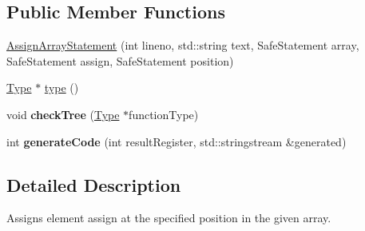 \subsection*{Public Member Functions}
\begin{DoxyCompactItemize}
\item 
\hyperlink{class_scribble_core_1_1_assign_array_statement_a1ee1ce9e49bb0c1c03f80cfb8e5d115d}{Assign\-Array\-Statement} (int lineno, std\-::string text, Safe\-Statement array, Safe\-Statement assign, Safe\-Statement position)
\item 
\hyperlink{class_scribble_core_1_1_type}{Type} $\ast$ \hyperlink{class_scribble_core_1_1_assign_array_statement_ac178b7f29bff1248d3a88023ae47eb96}{type} ()
\item 
\hypertarget{class_scribble_core_1_1_assign_array_statement_a5346d4acadb05916f47da731f23f70ef}{void {\bfseries check\-Tree} (\hyperlink{class_scribble_core_1_1_type}{Type} $\ast$function\-Type)}\label{class_scribble_core_1_1_assign_array_statement_a5346d4acadb05916f47da731f23f70ef}

\item 
\hypertarget{class_scribble_core_1_1_assign_array_statement_a53d2ef3cb8185606f678d7d60a8da426}{int {\bfseries generate\-Code} (int result\-Register, std\-::stringstream \&generated)}\label{class_scribble_core_1_1_assign_array_statement_a53d2ef3cb8185606f678d7d60a8da426}

\end{DoxyCompactItemize}


\subsection{Detailed Description}
Assigns element assign at the specified position in the given array. 

